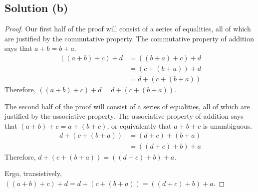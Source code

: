 \documentclass[11pt]{article}
\begin{document}
\subsection{Solution (b)}
    \begin{proof}
        Our first half of the proof will consist of a series of equalities, all of which are justified by the commutative property.
        The commutative property of addition says that $a + b = b + a$.
        \begin{align}
            ((a + b) + c) + d   &=  ((b + a) + c) + d\\
                &=  (c + (b + a)) + d\\
                &=  d + (c + (b + a))
        \end{align}
        Therefore, $((a + b) + c) + d = d + (c + (b + a))$.

        The second half of the proof will consist of a series of equalities, all of which are justified by the associative property.
        The associative property of addition says that $(a + b) + c = a + (b + c)$, or equivalently that $a + b + c$ is unambiguous.
        \begin{align}
            d + (c + (b + a))   &=  (d + c) + (b + a)\\
                &=  ((d + c) + b) + a
        \end{align}
        Therefore, $d + (c + (b + a)) = ((d + c) + b) + a$.

        Ergo, transistively, $((a + b) + c) + d = d + (c + (b + a)) = ((d + c) + b) + a$.
    \end{proof}
\pagebreak
\end{document}
